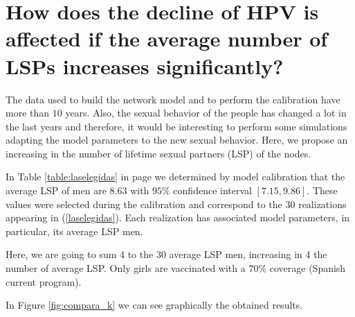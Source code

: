 \section{How does the decline of HPV is affected if the average number of LSPs increases significantly?}

The data used to build the network model and to perform the calibration have more than $10$ years. Also, the sexual behavior of the people has changed a lot in the last years and therefore, it would be interesting to perform some simulations adapting the model parameters to the new sexual behavior. Here, we propose an increasing in the number of lifetime sexual partners (LSP) of the nodes.

In Table \ref{table:laselegidas} in page \pageref{table:laselegidas} we determined by model calibration that the average LSP of men are $8.63$ with $95\%$ confidence interval $[7.15, 9.86]$. These values were selected during the calibration and correspond to the $30$  realizations appearing in (\ref{laselegidas}). Each realization has associated model parameters, in particular, its average LSP men.

Here, we are going to sum 4 to the $30$ average LSP men, increasing in 4 the number of average LSP. Only girls are vaccinated with a $70\%$ coverage (Spanish current program).

In Figure \ref{fig:compara_k} we can see graphically the obtained results. 

